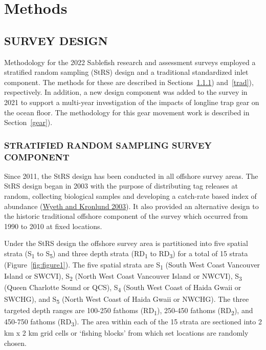 \documentclass[12pt]{article}\usepackage[]{graphicx}\usepackage[]{color}
\begin{document}
\clearpage

\hypertarget{methods}{%
\section{Methods}\label{methods}}

\hypertarget{survey-design}{%
\subsection{SURVEY DESIGN}\label{survey-design}}

Methodology for the 2022 Sablefish research and assessment surveys employed a stratified random sampling (StRS) design and a traditional standardized inlet component. The methods for these are described in Sections~\ref{strs}) and~\ref{trad}), respectively. In addition, a new design component was added to the survey in 2021 to support a multi-year investigation of the impacts of longline trap gear on the ocean floor. The methodology for this gear movement work is described in Section~\ref{gear}).

\hypertarget{strs}{%
\subsubsection{STRATIFIED RANDOM SAMPLING SURVEY COMPONENT}\label{strs}}

Since 2011, the StRS design has been conducted in all offshore survey areas. The StRS design began in 2003 with the purpose of distributing tag releases at random, collecting biological samples and developing a catch-rate based index of abundance (\protect\hyperlink{ref-Wyeth2003}{Wyeth and Kronlund 2003}). It also provided an alternative design to the historic traditional offshore component of the survey which occurred from 1990 to 2010 at fixed locations.

Under the StRS design the offshore survey area is partitioned into five spatial strata (S\textsubscript{1} to S\textsubscript{5}) and three depth strata (RD\textsubscript{1} to RD\textsubscript{3}) for a total of 15 strata (Figure~\ref{fig:figure1}). The five spatial strata are S\textsubscript{1} (South West Coast Vancouver Island or SWCVI), S\textsubscript{2} (North West Coast Vancouver Island or NWCVI), S\textsubscript{3} (Queen Charlotte Sound or QCS), S\textsubscript{4} (South West Coast of Haida Gwaii or SWCHG), and S\textsubscript{5} (North West Coast of Haida Gwaii or NWCHG). The three targeted depth ranges are 100-250 fathoms (RD\textsubscript{1}), 250-450 fathoms (RD\textsubscript{2}), and 450-750 fathoms (RD\textsubscript{3}). The area within each of the 15 strata are sectioned into 2 km x 2 km grid cells or `fishing blocks' from which set locations are randomly chosen.
\end{document}
